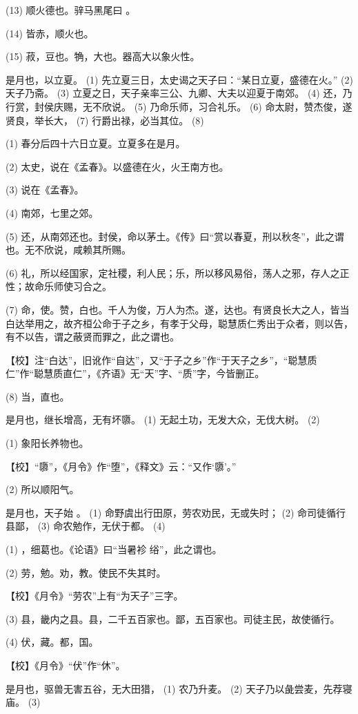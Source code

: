 \documentclass[12pt,UTF8]{ctexbook}
\begin{document}
(13) 顺火德也。骍马黑尾曰 。

(14) 皆赤，顺火也。

(15) 菽，豆也。觕，大也。器高大以象火性。

是月也，以立夏。 (1) 先立夏三日，太史谒之天子曰：“某日立夏，盛德在火。” (2) 天子乃斋。 (3) 立夏之日，天子亲率三公、九卿、大夫以迎夏于南郊。 (4) 还，乃行赏，封侯庆赐，无不欣说。 (5) 乃命乐师，习合礼乐。 (6) 命太尉，赞杰俊，遂贤良，举长大， (7) 行爵出禄，必当其位。 (8)

(1) 春分后四十六日立夏。立夏多在是月。

(2) 太史，说在《孟春》。以盛德在火，火王南方也。

(3) 说在《孟春》。

(4) 南郊，七里之郊。

(5) 还，从南郊还也。封侯，命以茅土。《传》曰“赏以春夏，刑以秋冬”，此之谓也。无不欣说，咸赖其所赐。

(6) 礼，所以经国家，定社稷，利人民；乐，所以移风易俗，荡人之邪，存人之正性；故命乐师使习合之。

(7) 命，使。赞，白也。千人为俊，万人为杰。遂，达也。有贤良长大之人，皆当白达举用之，故齐桓公命于子之乡，有孝于父母，聪慧质仁秀出于众者，则以告，有不以告，谓之蔽贤而罪之，此之谓也。

【校】注“白达”，旧讹作“自达”，又“于子之乡”作“于天子之乡”，“聪慧质仁”作“聪慧质直仁”，《齐语》无“天”字、“质”字，今皆删正。

(8) 当，直也。

是月也，继长增高，无有坏隳。 (1) 无起土功，无发大众，无伐大树。 (2)

(1) 象阳长养物也。

【校】“隳”，《月令》作“堕”，《释文》云：“又作‘隳’。”

(2) 所以顺阳气。

是月也，天子始 。 (1) 命野虞出行田原，劳农劝民，无或失时； (2) 命司徒循行县鄙， (3) 命农勉作，无伏于都。 (4)

(1) ，细葛也。《论语》曰“当暑袗 绤”，此之谓也。

(2) 劳，勉。劝，教。使民不失其时。

【校】《月令》“劳农”上有“为天子”三字。

(3) 县，畿内之县。县，二千五百家也。鄙，五百家也。司徒主民，故使循行。

(4) 伏，藏。都，国。

【校】《月令》“伏”作“休”。

是月也，驱兽无害五谷，无大田猎， (1) 农乃升麦。 (2) 天子乃以彘尝麦，先荐寝庙。 (3)
\end{document}
